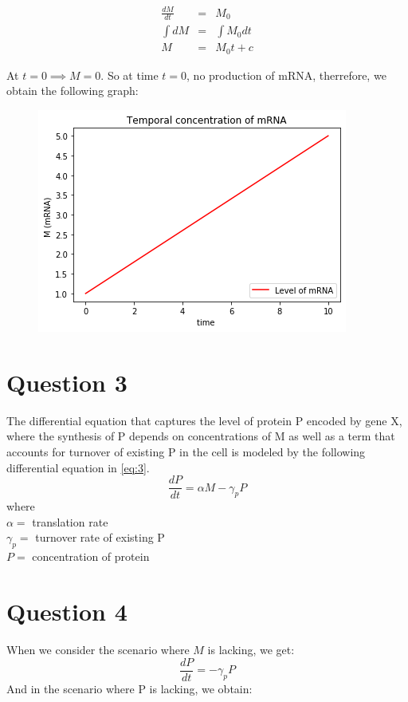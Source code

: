 \documentclass[12pt,a4paper]{article}
\begin{document}
\begin{eqnarray*}
\frac{dM}{dt} &=& M_0\\
\int dM &=& \int M_0 dt\\
M &=& M_0t + c
\end{eqnarray*}

At $t=0 \implies   M=0$.  So at time $t=0$,  no production of mRNA,  therrefore, we obtain the following graph:
\begin{figure}[H]
\centering
\includegraphics[scale=0.5]{./gaphics/q_2.png}
\caption{ }
\end{figure}

\section*{Question 3}
The differential equation that captures the level of protein P encoded by gene X,
where the synthesis of P depends on concentrations of M as well as a term that accounts for
turnover of existing P in the cell is modeled by the following differential equation in \eqref{eq:3}.
\begin{equation}
\frac{dP}{dt} =   \alpha M - \gamma_p P
\label{eq:3}
\end{equation}
where \\
$\alpha = $   translation rate\\
$ \gamma_p =  $ turnover rate of existing P\\
 $P = $ concentration of protein
\section*{Question 4}
When we consider the scenario where $M$ is lacking,  we get:
\begin{equation}
\frac{dP}{dt} = -\gamma_p P
\label{eq:4}
\end{equation}
And in the scenario  where P is lacking,  we obtain:
\end{document}

